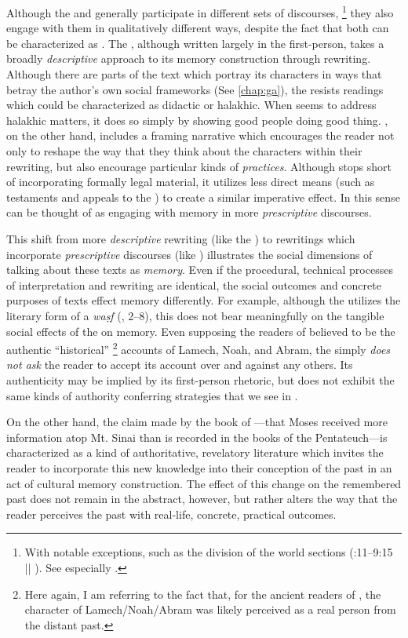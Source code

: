 Although the \ga and \jub generally participate in different sets of discourses,%
    \footnote{With notable exceptions, such as the division of the world sections (:11--9:15 ||  ). See especially \cite[105--130]{machiela2009}.}
they also engage with them in qualitatively different ways, despite the fact that both can be characterized as \psa. The \ga, although written largely in the first-person, takes a broadly \emph{descriptive} approach to its memory construction through rewriting. Although there are parts of the text which portray its characters in ways that betray the author's own social frameworks (See \autoref{chap:ga}), the \ga resists readings which could be characterized as didactic or halakhic. When \ga seems to address halakhic matters, it does so simply by showing good people doing good thing. \jub, on the other hand, includes a framing narrative which encourages the reader not only to reshape the way that they think about the characters within their rewriting, but also encourage particular kinds of \emph{practices}. Although \jub stops short of incorporating formally legal material, it utilizes less direct means (such as testaments and appeals to the \HT) to create a similar imperative effect. In this sense \jub can be thought of as engaging with memory in more \emph{prescriptive} discourses.


This shift from more \emph{descriptive} rewriting (like the \ga) to rewritings which incorporate \emph{prescriptive} discourses (like \jub) illustrates the social dimensions of talking about these texts as \emph{memory}. Even if the procedural, technical processes of interpretation and rewriting are identical, the social outcomes and concrete purposes of texts effect memory differently. For example, although the \ga utilizes the literary form of a \emph{waṣf} (, 2--8), this does not bear meaningfully on the tangible social effects of the \ga on memory. Even supposing the readers of \ga believed \ga to be the authentic ``historical''%
    \footnote{Here again, I am referring to the fact that, for the ancient readers of \jub, the character of Lamech/Noah/Abram was likely perceived as a real person from the distant past.}
accounts of Lamech, Noah, and Abram, the \ga simply \emph{does not ask} the reader to accept its account over and against any others. Its authenticity may be implied by its first-person rhetoric, but \ga does not exhibit the same kinds of authority conferring strategies that we see in \jub. 

On the other hand, the claim made by the book of \jub---that Moses received more information atop Mt. Sinai than is recorded in the books of the Pentateuch---is characterized as a kind of authoritative, revelatory literature which invites the reader to incorporate this new knowledge into their conception of the past in an act of cultural memory construction. The effect of this change on the remembered past does not remain in the abstract, however, but rather alters the way that the reader perceives the past with real-life, concrete, practical outcomes. 
